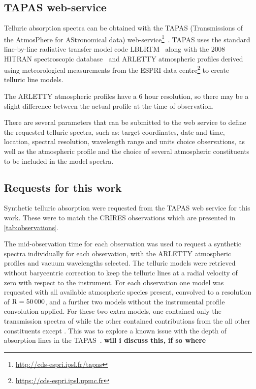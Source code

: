 

\subsection{TAPAS web-service}
\label{subsubsec:TAPAS}

Telluric absorption spectra can be obtained with the {TAPAS} (Transmissions of the AtmosPhere for AStronomical data) web-service\footnote{\href{http://cds-espri.ipsl.fr/tapas}{http://cds-espri.ipsl.fr/tapas}}~\citep{bertaux_tapas_2014}.
{TAPAS} uses the standard line-by-line radiative transfer model code LBLRTM~\citep{clough_linebyline_1995} along with the 2008 {HITRAN} spectroscopic database~\citep{rothman_hitran_2009} and {ARLETTY} atmospheric profiles derived using meteorological measurements from the ESPRI data centre\footnote{\href{https://cds-espri.ipsl.upmc.fr}{https://cds-espri.ipsl.upmc.fr}} to create telluric line models.

The {ARLETTY} atmospheric profiles have a 6 hour resolution, so there may be a slight difference between the actual profile at the time of observation.

There are several parameters that can be submitted to the web service to define the requested telluric spectra, such as: target coordinates, date and time, location, spectral resolution, wavelength range and units choice observations, as well as the atmospheric profile and the choice of several atmospheric constituents to be included in the model spectra.



\subsection{Requests for this work}

Synthetic telluric absorption were requested from the TAPAS web service for this work.
These were to match the CRIRES observations which are presented in \cref{tab:observations}.
 
The mid-observation time for each observation was used to request a synthetic spectra individually for each observation, with the {ARLETTY} atmospheric profiles and vacuum wavelengths selected.
The telluric models were retrieved without barycentric correction to keep the telluric lines at a radial velocity of zero with respect to the instrument.
For each observation one model was requested with all available atmospheric species present, convolved to a resolution of \(\rm R=50\,000\), and a further two models without the instrumental profile convolution applied.
For these two extra models, one contained only the transmission spectra of  while the other contained contributions from the all other constituents except .
This was to explore a known issue with the depth of  absorption lines in the {TAPAS}~\citet{bertaux_tapas_2014}.
\textbf{will i discuss this, if so where}





